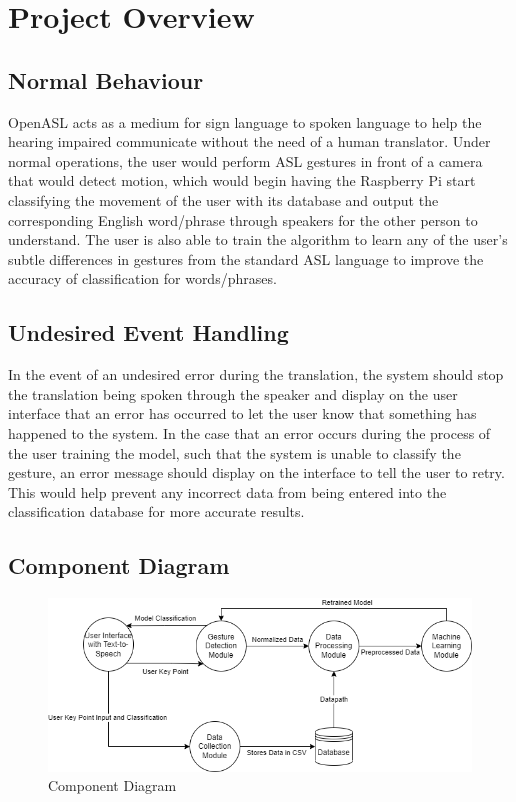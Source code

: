 \documentclass[12pt, titlepage]{article}
\begin{document}
\section{Project Overview}

\subsection{Normal Behaviour}
OpenASL acts as a medium for sign language to spoken language to help the hearing impaired communicate without the need of a human translator. 
Under normal operations, the user would perform ASL gestures in front of a camera that would detect motion, which would begin having the Raspberry Pi 
start classifying the movement of the user with its database and output the corresponding English word/phrase through speakers for the other person to 
understand. The user is also able to train the algorithm to learn any of the user’s subtle differences in gestures from the standard ASL language to 
improve the accuracy of classification for words/phrases.

\subsection{Undesired Event Handling}
In the event of an undesired error during the translation, the system should stop the translation being spoken through the speaker and display on the 
user interface that an error has occurred to let the user know that something has happened to the system. In the case that an error occurs during the 
process of the user training the model, such that the system is unable to classify the gesture, an error message should display on the interface to 
tell the user to retry. This would help prevent any incorrect data from being entered into the classification database for more accurate results.

\subsection{Component Diagram}

\begin{figure}[H] 
\centering
\includegraphics[width=\textwidth,height=0.88\textheight,keepaspectratio]{ComponentDiagram.png} 
\caption{Component Diagram} 
\label{Fig.Component_Diagram} 
\end{figure}
\end{document}

